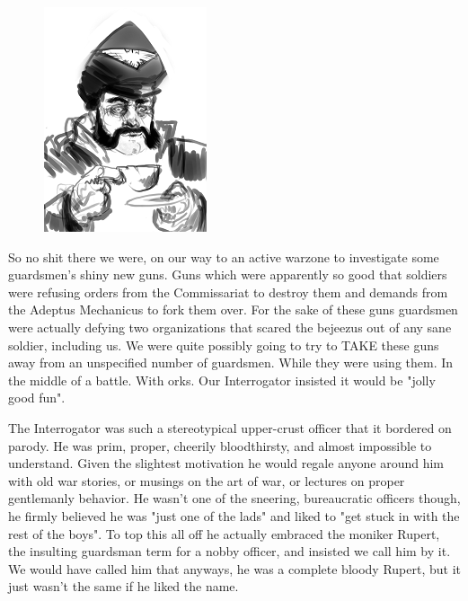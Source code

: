 \begin{figure}
	\begin{center}
		\includegraphics[width=\figwidth]{pics/4/3.png}
	\end{center}
\end{figure}
So no shit there we were, on our way to an active warzone to investigate some guardsmen's shiny new guns. 
Guns which were apparently so good that soldiers were refusing orders from the Commissariat to destroy them and demands from the Adeptus Mechanicus to fork them over. 
For the sake of these guns guardsmen were actually defying two organizations that scared the bejeezus out of any sane soldier, including us. 
We were quite possibly going to try to TAKE these guns away from an unspecified number of guardsmen. 
While they were using them. 
In the middle of a battle. 
With orks. 
Our Interrogator insisted it would be "jolly good fun".

The Interrogator was such a stereotypical upper-crust officer that it bordered on parody. He was prim, proper, cheerily bloodthirsty, and almost impossible to understand. 
Given the slightest motivation he would regale anyone around him with old war stories, or musings on the art of war, or lectures on proper gentlemanly behavior. 
He wasn't one of the sneering, bureaucratic officers though, he firmly believed he was "just one of the lads" and liked to "get stuck in with the rest of the boys".
To top this all off he actually embraced the moniker Rupert, the insulting guardsman term for a nobby officer, and insisted we call him by it. 
We would have called him that anyways, he was a complete bloody Rupert, but it just wasn't the same if he liked the name.

